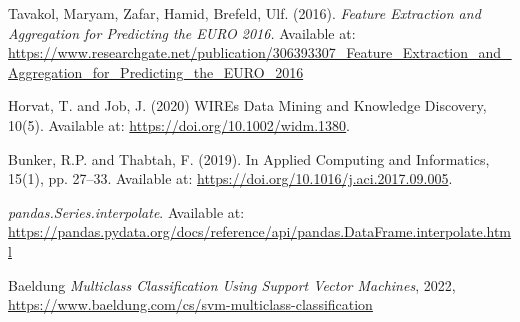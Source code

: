\documentclass[8pt]{article}
\begin{document}
\begin{thebibliography}{1}
Tavakol, Maryam, Zafar, Hamid, Brefeld, Ulf. (2016). \textit{Feature Extraction and Aggregation for Predicting the EURO 2016.} Available at: \url{https://www.researchgate.net/publication/306393307_Feature_Extraction_and_Aggregation_for_Predicting_the_EURO_2016}


    Horvat, T. and Job, J. (2020) 
    \newblock WIREs Data Mining and Knowledge Discovery, 10(5). Available at: \url{https://doi.org/10.1002/widm.1380}.


    Bunker, R.P. and Thabtah, F. (2019).
    \newblock In Applied Computing and Informatics, 15(1), pp. 27–33. Available at: \url{https://doi.org/10.1016/j.aci.2017.09.005}.

\textit{pandas.Series.interpolate}. Available at: \url{https://pandas.pydata.org/docs/reference/api/pandas.DataFrame.interpolate.html}


    Baeldung
    \textit{Multiclass Classification Using Support Vector Machines},
    2022,
    \url{https://www.baeldung.com/cs/svm-multiclass-classification}






\end{thebibliography}
\end{document}
